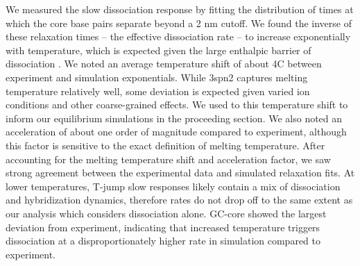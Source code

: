 \documentclass[journal=jpcbfk,manuscript=article]{achemso}
\begin{document}
We measured the slow dissociation response by fitting the distribution of times at which the core base pairs separate beyond a 2 nm cutoff. We found the inverse of these relaxation times -- the effective dissociation rate -- to increase exponentially with temperature, which is expected given the large enthalpic barrier of dissociation \citep{Craig1971ElaxationOligon,Porschke1971CooperativeTransition,Williams1989LaserDGCATGC}. We noted an average temperature shift of about 4C between experiment and simulation exponentials. While 3spn2 captures melting temperature relatively well, some deviation is expected given varied ion conditions and other coarse-grained effects. We used to this temperature shift to inform our equilibrium simulations in the proceeding section. We also noted an acceleration of about one order of magnitude compared to experiment, although this factor is sensitive to the exact definition of melting temperature. After accounting for the melting temperature shift and acceleration factor, we saw strong agreement between the experimental data and simulated relaxation fits. At lower temperatures, T-jump slow responses likely contain a mix of dissociation and hybridization dynamics, therefore rates do not drop off to the same extent as our analysis which considers dissociation alone. GC-core showed the largest deviation from experiment, indicating that increased temperature triggers dissociation at a disproportionately higher rate in simulation compared to experiment. 


\end{document}
